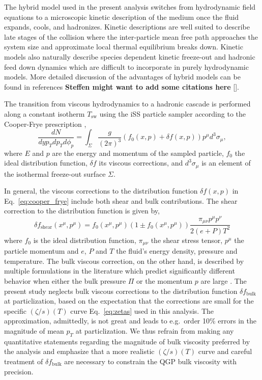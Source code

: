 \documentclass[aps,prc,reprint,amsmath,nofootinbib,superscriptaddress]{revtex4-1}
\begin{document}
The hybrid model used in the present analysis switches from hydrodynamic field equations to a microscopic kinetic description of the medium once the fluid expands, cools, and hadronizes. Kinetic descriptions are well suited to describe late stages of the collision where the inter-particle mean free path approaches the system size and approximate local thermal equilibrium breaks down.
Kinetic models also naturally describe species dependent kinetic freeze-out and hadronic feed down dynamics which are difficult to incorporate in purely hydrodynamic models.
More detailed discussion of the advantages of hybrid models can be found in references {\bf Steffen might want to add some citations here} \ref{}.

The transition from viscous hydrodynamics to a hadronic cascade is performed along a constant isotherm $T_\text{sw}$ using the iSS particle sampler \cite{Shen:2014vra, Qiu:2013wca} according to the Cooper-Frye prescription \cite{Cooper:1974mv},
\begin{equation}
  \frac{dN}{dy p_T dp_T d\phi_p} =
    \int_\Sigma \frac{g}{(2\pi)^3} (f_0(x,p) + \delta f(x,p)) p^\mu d^3 \sigma_\mu,
  \label{eq:cooper_frye}
\end{equation}
where $E$ and $p$ are the energy and momentum of the sampled particle, $f_0$ the ideal distribution function, $\delta f$ its viscous corrections, and $d^3\sigma_\mu$ is an element of the isothermal freeze-out surface $\Sigma$.

In general, the viscous corrections to the distribution function $\delta f(x, p)$ in Eq.~\eqref{eq:cooper_frye} include both shear and bulk contributions.
The shear correction to the distribution function is given by,
\begin{equation}
  \delta f_\text{shear}(x^\mu, p^\mu) =
    f_0(x^\mu, p^\mu)(1 \pm f_0(x^\mu, p^\mu))
    \frac{\pi_{\mu\nu}p^\mu p^\nu}{2(e+P)T^2}
\end{equation}
where $f_0$ is the ideal distribution function, $\pi_{\mu\nu}$ the shear stress tensor, $p^\mu$ the particle momentum and $e$, $P$ and $T$ the fluid's energy density, pressure and temperature.
The bulk viscous correction, on the other hand, is described by multiple formulations in the literature which predict significantly different behavior when either the bulk pressure $\Pi$ or the momentum $p$ are large \cite{Dusling:2011fd, Noronha-Hostler:2013gga}. The present study neglects bulk viscous corrections to the distribution function $\delta f_\text{bulk}$ at particlization, based on the expectation that the corrections are small for the specific $(\zeta/s)(T)$ curve Eq.~\eqref{eq:zetas} used in this analysis. The approximation, admittedly, is not great and leads to e.g.\ order 10\% errors in the magnitude of mean $p_T$ at particlization. We thus refrain from making any quantitative statements regarding the magnitude of bulk viscosity preferred by the analysis and emphasize that a more realistic $(\zeta/s)(T)$ curve and careful treatment of $\delta f_\text{bulk}$ are necessary to constrain the QGP bulk viscosity with precision.
\end{document}
